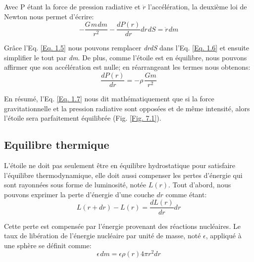 Avec P étant la force de pression radiative et $\ddot{r}$ l'accélération, la deuxième loi de Newton nous permet
d'écrire\footnotemark[3]:\begin{equation}-\dfrac{G\hspace{1pt}m\hspace{1pt}dm}{r^{2}}-\dfrac{dP(r)}{dr}dr\hspace{1pt}dS=\ddot r\hspace{1pt}dm\label{Eq. 1.6}\end{equation}

Grâce l'Eq. \ref{Eq. 1.5} nous pouvons remplacer \textit{dr\hspace{1pt}dS} dans l'Eq. \ref{Eq. 1.6} et ensuite simplifier le tout par \textit{dm}. De plus, comme l'étoile est en équilibre, nous pouvons affirmer que son accélération est nulle; en réarrangeant les termes nous obtenons:\begin{equation}\boxed{\dfrac{dP(r)}{dr}=-\rho\hspace{2pt}\frac{Gm}{r^{2}}}\label{Eq. 1.7}\end{equation}

En résumé, l'Eq. \ref{Eq. 1.7} nous dit mathématiquement que si la force gravitationnelle et la pression radiative sont opposées et de même intensité, alors l'étoile sera parfaitement équilibrée (Fig. \ref{Fig. 7.1}).


\subsection{Equilibre thermique}

L'étoile ne doit pas seulement être en équilibre hydrostatique pour satisfaire l'équilibre thermodynamique, elle doit aussi compenser les pertes d'énergie qui sont rayonnées sous forme de luminosité, notée $L(r)$. Tout d'abord, nous pouvons exprimer la perte d'énergie d'une couche $dr$ comme étant:\begin{equation}L(r+dr)-L(r)=\dfrac{dL(r)}{dr}dr\label{Eq. 1.8}\end{equation}

Cette perte est compensée par l'énergie provenant des réactions nucléaires. Le taux de libération de l'énergie nucléaire par unité de masse, noté $\epsilon$, appliqué à une sphère se définit comme:\begin{equation}\epsilon\hspace{1pt}dm=\epsilon\rho(r)4\pi r^{2}dr\label{Eq. 1.9}\end{equation}

